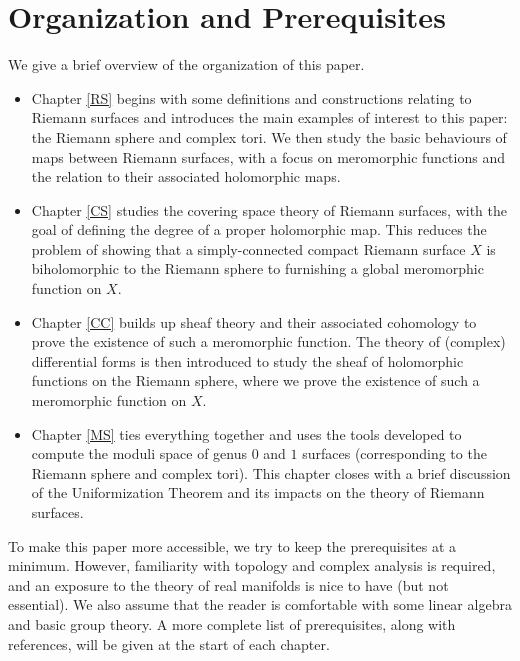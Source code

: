 \documentclass[../Moduli_Spaces_of_Riemann_Surfaces.tex]{subfiles}
\begin{document}
    \section{Organization and Prerequisites}
    We give a brief overview of the organization of this paper.
    \begin{itemize}
        \item Chapter \ref{RS} begins with some definitions and constructions relating to Riemann surfaces and introduces the main examples of interest to this paper: the Riemann sphere and complex tori. We then study the basic behaviours of maps between Riemann surfaces, with a focus on meromorphic functions and the relation to their associated holomorphic maps.
        \item Chapter \ref{CS} studies the covering space theory of Riemann surfaces, with the goal of defining the degree of a proper holomorphic map. This reduces the problem of showing that a simply-connected compact Riemann surface $X$ is biholomorphic to the Riemann sphere to furnishing a global meromorphic function on $X$.
        \item Chapter \ref{CC} builds up sheaf theory and their associated cohomology to prove the existence of such a meromorphic function. The theory of (complex) differential forms is then introduced to study the sheaf of holomorphic functions on the Riemann sphere, where we prove the existence of such a meromorphic function on $X$.
        \item Chapter \ref{MS} ties everything together and uses the tools developed to compute the moduli space of genus $0$ and $1$ surfaces (corresponding to the Riemann sphere and complex tori). This chapter closes with a brief discussion of the Uniformization Theorem and its impacts on the theory of Riemann surfaces.
    \end{itemize}
    To make this paper more accessible, we try to keep the prerequisites at a minimum. However, familiarity with topology and complex analysis is required, and an exposure to the theory of real manifolds is nice to have (but not essential). We also assume that the reader is comfortable with some linear algebra and basic group theory. A more complete list of prerequisites, along with references, will be given at the start of each chapter.
\end{document}
